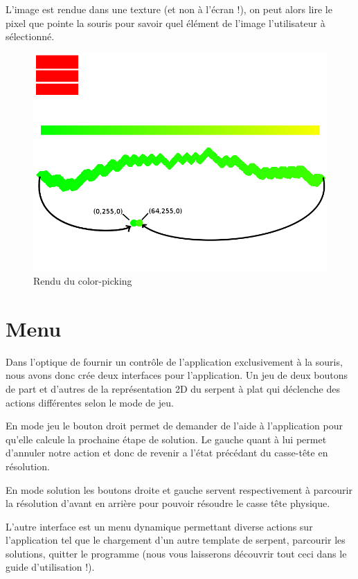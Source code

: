 L'image est rendue dans une texture (et non à l'écran !), on peut alors lire le pixel que pointe la souris pour savoir quel élément de l'image l'utilisateur à  sélectionné.

\begin{figure}[h]
 \centering
 \includegraphics[scale=0.3,keepaspectratio=true]{img/colorpick.png}
 \caption{Rendu du color-picking}
 \label{colorPick}
\end{figure}

\section{Menu}
Dans l'optique de fournir un contrôle de l'application exclusivement à la souris, nous avons donc crée deux interfaces pour l'application.
Un jeu de deux boutons de part et d'autres de la représentation 2D du serpent à plat qui déclenche des actions différentes selon le mode de jeu.\newline

En mode jeu le bouton droit permet de demander de l'aide à l'application pour qu'elle calcule la prochaine étape de solution. Le gauche quant à lui permet d'annuler notre action et donc de revenir a l'état précédant du casse-tête en résolution.\newline

En mode solution les boutons droite et gauche servent respectivement à parcourir la résolution d'avant en arrière pour pouvoir résoudre le casse tête physique.\newline

L'autre interface est un menu dynamique permettant diverse actions sur l'application tel que le chargement d'un autre template de serpent, parcourir les solutions, quitter le programme (nous vous laisserons découvrir tout ceci dans le guide d'utilisation !).
